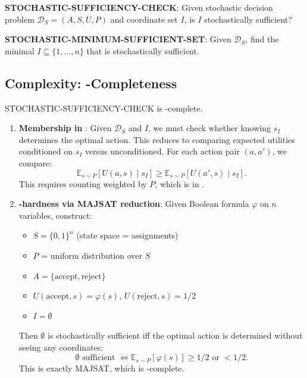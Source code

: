\begin{decision}\label{dec:stochastic-sufficiency-check}
\textbf{STOCHASTIC-SUFFICIENCY-CHECK}: Given stochastic decision problem $\mathcal{D}_S = (A, S, U, P)$ and coordinate set $I$, is $I$ stochastically sufficient?
\end{decision}

\begin{decision}\label{dec:stochastic-minsuff}
\textbf{STOCHASTIC-MINIMUM-SUFFICIENT-SET}: Given $\mathcal{D}_S$, find the minimal $I \subseteq \{1, \ldots, n\}$ that is stochastically sufficient.
\end{decision}

\subsection{Complexity: \PP-Completeness}

\begin{theorem}\label{th:stochastic-sufficiency-pp}
STOCHASTIC-SUFFICIENCY-CHECK is \PP-complete.
\end{theorem}

\begin{enumerate}
\item \textbf{Membership in \PP}: Given $\mathcal{D}_S$ and $I$, we must check whether knowing $s_I$ determines the optimal action. This reduces to comparing expected utilities conditioned on $s_I$ versus unconditioned. For each action pair $(a, a')$, we compare:
\[
\mathbb{E}_{s \sim P}[U(a,s) \mid s_I] \geq \mathbb{E}_{s \sim P}[U(a',s) \mid s_I].
\]
This requires counting weighted by $P$, which is in \PP.

\item \textbf{\PP-hardness via MAJSAT reduction}: Given Boolean formula $\varphi$ on $n$ variables, construct:
\begin{itemize}
\item $S = \{0,1\}^n$ (state space = assignments)
\item $P$ = uniform distribution over $S$
\item $A = \{\text{accept}, \text{reject}\}$
\item $U(\text{accept}, s) = \varphi(s)$, $U(\text{reject}, s) = 1/2$
\item $I = \emptyset$
\end{itemize}
Then $\emptyset$ is stochastically sufficient iff the optimal action is determined without seeing any coordinates:
\[
\emptyset \text{ sufficient } \iff \mathbb{E}_{s \sim P}[\varphi(s)] \geq 1/2 \text{ or } < 1/2.
\]
This is exactly MAJSAT, which is \PP-complete.
\end{enumerate}

